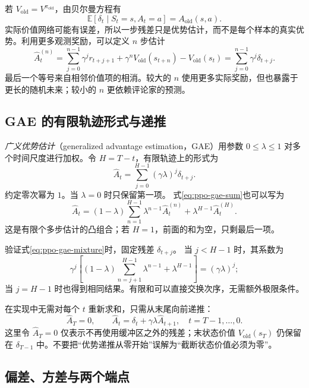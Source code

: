 \documentclass[UTF8,12pt,a4paper,fontset=fandol]{ctexart}
\begin{document}
若 $V_{\mathrm{old}}=V^{\pi_{\mathrm{old}}}$，由贝尔曼方程有
\[
  \mathbb E[\delta_t\mid S_t=s,A_t=a]
  =A_{\mathrm{old}}(s,a).
\]
实际价值网络可能有误差，所以一步残差只是优势估计，而不是每个样本的真实优势。利用更多观测奖励，可以定义 $n$ 步估计
\begin{equation}
  \widehat A_t^{(n)}
  =\sum_{j=0}^{n-1}\gamma^j r_{t+j+1}
   +\gamma^nV_{\mathrm{old}}(s_{t+n})
   -V_{\mathrm{old}}(s_t)
  =\sum_{j=0}^{n-1}\gamma^j\delta_{t+j}.
  \label{eq:ppo-nstep-advantage}
\end{equation}
最后一个等号来自相邻价值项的相消。较大的 $n$ 使用更多实际奖励，但也暴露于更长的随机未来；较小的 $n$ 更依赖评论家的预测。

\subsection{GAE 的有限轨迹形式与递推}

\emph{广义优势估计}（generalized advantage estimation，GAE）用参数 $0\le\lambda\le1$ 对多个时间尺度进行加权\cite{schulman-gae}。令 $H=T-t$，有限轨迹上的形式为
\begin{equation}
  \widehat A_t
  =\sum_{j=0}^{H-1}(\gamma\lambda)^j\delta_{t+j}.
  \label{eq:ppo-gae-sum}
\end{equation}
约定零次幂为 $1$。当 $\lambda=0$ 时只保留第一项。
式\eqref{eq:ppo-gae-sum}也可以写为
\begin{equation}
  \widehat A_t
  =(1-\lambda)\sum_{n=1}^{H-1}\lambda^{n-1}\widehat A_t^{(n)}
   +\lambda^{H-1}\widehat A_t^{(H)}.
  \label{eq:ppo-gae-mixture}
\end{equation}
这是有限个多步估计的凸组合；若 $H=1$，前面的和为空，只剩最后一项。

验证式\eqref{eq:ppo-gae-mixture}时，固定残差 $\delta_{t+j}$。
当 $j<H-1$ 时，其系数为
\[
  \gamma^j\left[
    (1-\lambda)\sum_{n=j+1}^{H-1}\lambda^{n-1}
    +\lambda^{H-1}\right]
  =(\gamma\lambda)^j;
\]
当 $j=H-1$ 时也得到相同结果。有限和可以直接交换次序，无需额外极限条件。

在实现中无需对每个 $t$ 重新求和，只需从末尾向前递推：
\begin{equation}
  \widehat A_T=0,\qquad
  \widehat A_t=\delta_t+\gamma\lambda\widehat A_{t+1},
  \quad t=T-1,\ldots,0.
  \label{eq:ppo-gae-recursion}
\end{equation}
这里令 $\widehat A_T=0$ 仅表示不再使用缓冲区之外的残差；末状态价值
$V_{\mathrm{old}}(s_T)$ 仍保留在 $\delta_{T-1}$ 中。不要把“优势递推从零开始”误解为“截断状态价值必须为零”。

\subsection{偏差、方差与两个端点}
\end{document}
